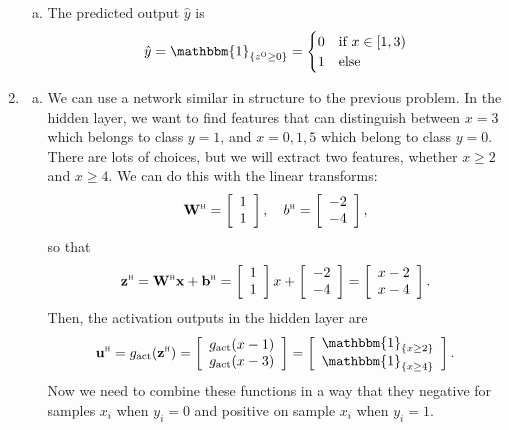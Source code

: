 \documentclass[11pt]{article}
\newcommand{\bbf}{\mathbf{b}}
\newcommand{\ubf}{\mathbf{u}}
\newcommand{\xbf}{\mathbf{x}}
\newcommand{\zbf}{\mathbf{z}}
\newcommand{\Wbf}{\mathbf{W}}
\newcommand{\indic}[1]{\mathbbm{1}_{ \{ {#1} \} }}
\def\hid{\textsc{\tiny H}}
\def\out{\textsc{\tiny O}}
\begin{document}
\begin{enumerate}
\begin{enumerate}[(a)]
\item The predicted output $\hat{y}$ is
\[
    \hat{y} = \indic{z^\out \geq 0} =
    \begin{cases}
        0 & \mbox{if } x \in [1,3) \\
        1 & \mbox{else}
     \end{cases}
\]
\end{enumerate}

\item \label{prob:nncreate}
\begin{enumerate}[(a)]
\item
We can use a network similar in structure to the previous problem.
In the hidden layer, we want to find features that can distinguish between
$x=3$ which belongs to class $y=1$, and $x=0,1,5$ which belong to class $y=0$.
There are lots of choices, but we will extract two features, whether $x \geq 2$
and $x \geq 4$.  We can do this with the linear transforms:
\[
    \Wbf^\hid = \left[ \begin{array}{c} 1 \\ 1 \end{array} \right], \quad
    b^\hid = \left[ \begin{array}{c} -2 \\ -4 \end{array} \right],
\]
so that
\[
    \zbf^\hid = \Wbf^\hid\xbf + \bbf^\hid =
    \left[ \begin{array}{c} 1 \\ 1 \end{array} \right]x +
    \left[ \begin{array}{c} -2 \\ -4 \end{array} \right] =
    \left[ \begin{array}{c} x-2 \\ x-4 \end{array} \right].
\]
Then, the activation outputs in the hidden layer are
\[
    \ubf^\hid = g_{\rm act}(\zbf^\hid) =
     \left[ \begin{array}{c} g_{\rm act}(x-1) \\ g_{\rm act}(x-3) \end{array} \right]
     =
     \left[ \begin{array}{c} \indic{x \geq 2} \\ \indic{x \geq 4} \end{array} \right].
\]
Now we need to combine these functions in a way that they negative
for samples $x_i$ when $y_i=0$ and positive on sample $x_i$ when $y_i=1$.

\end{enumerate}
\end{enumerate}
\end{document}
